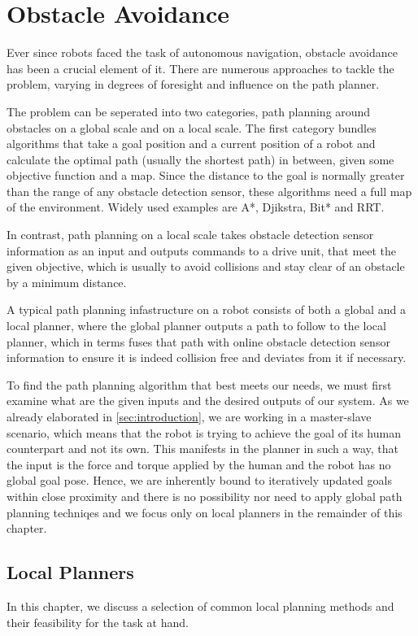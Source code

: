 \chapter{Obstacle Avoidance}
Ever since robots faced the task of autonomous navigation, obstacle avoidance has been a crucial element of it. There are numerous approaches to tackle the problem, varying in degrees of foresight and influence on the path planner.

The problem can be seperated into two categories, path planning around obstacles on a global scale and on a local scale. The first category bundles algorithms that take a goal position and a current position of a robot and calculate the optimal path (usually the shortest path) in between, given some objective function and a map. Since the distance to the goal is normally greater than the range of any obstacle detection sensor, these algorithms need a full map of the environment. Widely used examples are A*, Djikstra, Bit* and RRT.

In contrast, path planning on a local scale takes obstacle detection sensor information as an input and outputs commands to a drive unit, that meet the given objective, which is usually to avoid collisions and stay clear of an obstacle by a minimum distance. 

A typical path planning infastructure on a robot consists of both a global and a local planner, where the global planner outputs a path to follow to the local planner, which in terms fuses that path with online obstacle detection sensor information to ensure it is indeed collision free and deviates from it if necessary.

To find the path planning algorithm that best meets our needs, we must first examine what are the given inputs and the desired outputs of our system. As we already elaborated in \cref{sec:introduction}, we are working in a master-slave scenario, which means that the robot is trying to achieve the goal of its human counterpart and not its own. This manifests in the planner in such a way, that the input is the force and torque applied by the human and the robot has no global goal pose. Hence, we are inherently bound to iteratively updated goals within close proximity and there is no possibility nor need to apply global path planning techniqes and we focus only on local planners in the remainder of this chapter.

\section{Local Planners}
In this chapter, we discuss a selection of common local planning methods and their feasibility for the task at hand.
